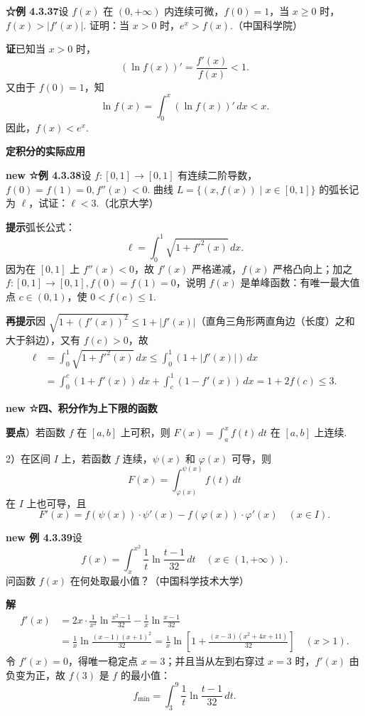 \documentclass[UTF8, 12pt, fontset=fandol, oneside]{ctexart}
\begin{document}
\noindent\textbf{☆例 4.3.37}\quad 设 $f(x)$ 在 $(0,+\infty)$ 内连续可微，$f(0)=1$，当 $x\ge0$ 时，$f(x)>|f'(x)|$. 证明：当 $x>0$ 时，$e^x>f(x)$.（中国科学院）

\noindent\textbf{证}\quad 已知当 $x>0$ 时，
\[
(\ln f(x))'=\frac{f'(x)}{f(x)}<1.
\]
又由于 $f(0)=1$，知
\[
\ln f(x)=\int_0^x(\ln f(x))'\,dx<x.
\]
因此，$f(x)<e^x$.

\noindent\textbf{定积分的实际应用}

\noindent\textbf{new ☆例 4.3.38}\quad 设 $f:[0,1]\to[0,1]$ 有连续二阶导数，$f(0)=f(1)=0,f''(x)<0$. 曲线 $L=\{(x,f(x))\mid x\in[0,1]\}$ 的弧长记为 $\ell$，试证：$\ell<3$.（北京大学）

\noindent\textbf{提示}\quad 弧长公式：
\[
\ell=\int_0^1\sqrt{1+f'^2(x)}\,dx.
\]
因为在 $[0,1]$ 上 $f''(x)<0$，故 $f'(x)$ 严格递减，$f(x)$ 严格凸向上；加之 $f:[0,1]\to[0,1],f(0)=f(1)=0$，说明 $f(x)$ 是单峰函数：有唯一最大值点 $c\in(0,1)$，使 $0<f(c)\le1$.

\noindent\textbf{再提示}\quad 因 $\sqrt{1+(f'(x))^2}\le1+|f'(x)|$（直角三角形两直角边（长度）之和大于斜边），又有 $f(c)>0$，故
\[
\begin{aligned}
\ell
&=\int_0^1\sqrt{1+f'^2(x)}\,dx
\le\int_0^1(1+|f'(x)|)\,dx\\
&=\int_0^c(1+f'(x))\,dx+\int_c^1(1-f'(x))\,dx
=1+2f(c)\le3.
\end{aligned}
\]

\noindent\textbf{new ☆四、积分作为上下限的函数}

\noindent\textbf{要点}）若函数 $f$ 在 $[a,b]$ 上可积，则 $F(x)=\int_a^x f(t)\,dt$ 在 $[a,b]$ 上连续.

2）在区间 $I$ 上，若函数 $f$ 连续，$\psi(x)$ 和 $\varphi(x)$ 可导，则
\[
F(x)=\int_{\varphi(x)}^{\psi(x)} f(t)\,dt
\]
在 $I$ 上也可导，且
\[
F'(x)=f(\psi(x))\cdot\psi'(x)-f(\varphi(x))\cdot\varphi'(x)\quad(x\in I).
\]

\noindent\textbf{new 例 4.3.39}\quad 设
\[
f(x)=\int_x^{x^2}\frac1t\ln\frac{t-1}{32}\,dt\quad(x\in(1,+\infty)).
\]
问函数 $f(x)$ 在何处取最小值？（中国科学技术大学）

\noindent\textbf{解}\quad
\[
\begin{aligned}
f'(x)
&=2x\cdot\frac1{x^2}\ln\frac{x^2-1}{32}
-\frac1x\ln\frac{x-1}{32}\\
&=\frac1x\ln\frac{(x-1)(x+1)^2}{32}
=\frac1x\ln\left[1+\frac{(x-3)(x^2+4x+11)}{32}\right]\quad(x>1).
\end{aligned}
\]
令 $f'(x)=0$，得唯一稳定点 $x=3$；并且当从左到右穿过 $x=3$ 时，$f'(x)$ 由负变为正，故 $f(3)$ 是 $f$ 的最小值：
\[
f_{\min}=\int_3^9\frac1t\ln\frac{t-1}{32}\,dt.
\]
\end{document}
